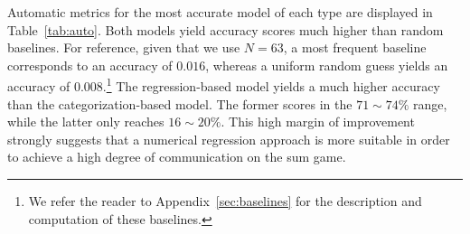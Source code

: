 \documentclass[twocolumn]{article}
\begin{document}
\begin{table}%
    \centering

    \caption{\label{tab:auto} Performances of best models}
\end{table}

Automatic metrics for the most accurate model of each type are displayed in Table~\ref{tab:auto}.
Both models yield accuracy scores much higher than random baselines.
For reference, given that we use $N=63$, a most frequent baseline corresponds to an accuracy of $0.016$, whereas a uniform random guess yields an accuracy of $0.008$.\footnote{
    We refer the reader to Appendix~\ref{sec:baselines} for the description and computation of these baselines.
}
The regression-based model yields a much higher accuracy than the categorization-based model.
The former scores in the $71\sim74\%$ range, while the latter only reaches $16\sim20\%$.
This high margin of improvement strongly suggests that a numerical regression approach is more suitable in order to achieve a high degree of communication on the sum game.
\end{document}
